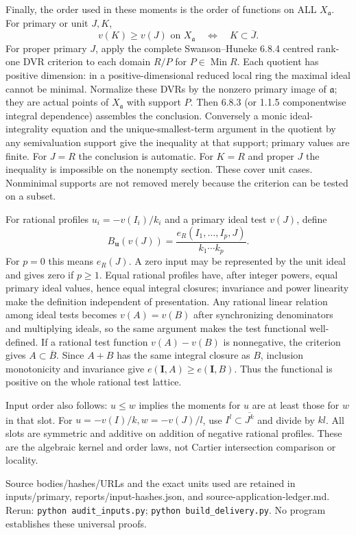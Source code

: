 \documentclass[
  11pt,
]{article}
\begin{document}
Finally, the order used in these moments is the order of functions on
ALL \(X_{\mathfrak a}\). For primary or unit \(J,K\),
\[v(K)\ge v(J)\text{ on }X_{\mathfrak a}\quad\Longleftrightarrow\quad K\subset\overline J.\]
For proper primary \(J\), apply the complete Swanson--Huneke 6.8.4
centred rank-one DVR criterion to each domain \(R/P\) for
\(P\in\operatorname{Min}R\). Each quotient has positive dimension: in a
positive-dimensional reduced local ring the maximal ideal cannot be
minimal. Normalize these DVRs by the nonzero primary image of
\(\mathfrak a\); they are actual points of \(X_{\mathfrak a}\) with
support \(P\). Then 6.8.3 (or 1.1.5 componentwise integral dependence)
assembles the conclusion. Conversely a monic ideal-integrality equation
and the unique-smallest-term argument in the quotient by any
semivaluation support give the inequality at that support; primary
values are finite. For \(J=R\) the conclusion is automatic. For \(K=R\)
and proper \(J\) the inequality is impossible on the nonempty section.
These cover unit cases. Nonminimal supports are not removed merely
because the criterion can be tested on a subset.

For rational profiles \(u_i=-v(I_i)/k_i\) and a primary ideal test
\(v(J)\), define
\[B_{\boldsymbol u}(v(J))=\frac{e_R(I_1,\ldots,I_p,J)}{k_1\cdots k_p}.\]
For \(p=0\) this means \(e_R(J)\). A zero input may be represented by
the unit ideal and gives zero if \(p\ge1\). Equal rational profiles
have, after integer powers, equal primary ideal values, hence equal
integral closures; invariance and power linearity make the definition
independent of presentation. Any rational linear relation among ideal
tests becomes \(v(A)=v(B)\) after synchronizing denominators and
multiplying ideals, so the same argument makes the test functional
well-defined. If a rational test function \(v(A)-v(B)\) is nonnegative,
the criterion gives \(A\subset\overline B\). Since \(A+B\) has the same
integral closure as \(B\), inclusion monotonicity and invariance give
\(e(\boldsymbol I,A)\ge e(\boldsymbol I,B)\). Thus the functional is
positive on the whole rational test lattice.

Input order also follows: \(u\le w\) implies the moments for \(u\) are
at least those for \(w\) in that slot. For \(u=-v(I)/k,w=-v(J)/l\), use
\(I^l\subset\overline{J^k}\) and divide by \(kl\). All slots are
symmetric and additive on addition of negative rational profiles. These
are the algebraic kernel and order laws, not Cartier intersection
comparison or locality.

Source bodies/hashes/URLs and the exact units used are retained in
inputs/primary, reports/input-hashes.json, and
source-application-ledger.md. Rerun: \texttt{python\ audit\_inputs.py};
\texttt{python\ build\_delivery.py}. No program establishes these
universal proofs.
\end{document}
